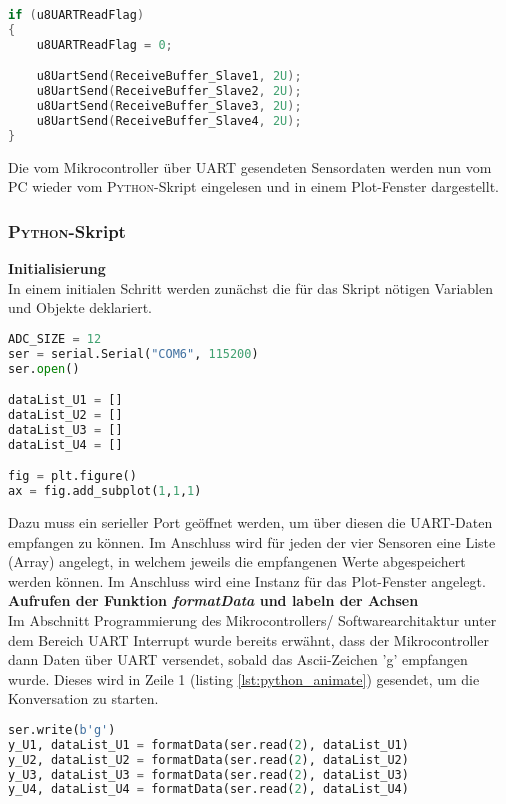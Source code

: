 \documentclass[
	letterpaper, %
	10pt, %
]{CSUniSchoolLabReport}
\begin{document}
\begin{spacing}{1.6}
\begin{lstlisting}[caption={Auszug aus while(1) - Projekt \glqq Kraftsensor\grqq},label={lst:while1_UART},language=C]
if (u8UARTReadFlag)
{
    u8UARTReadFlag = 0;

    u8UartSend(ReceiveBuffer_Slave1, 2U);
    u8UartSend(ReceiveBuffer_Slave2, 2U);
    u8UartSend(ReceiveBuffer_Slave3, 2U);
    u8UartSend(ReceiveBuffer_Slave4, 2U);
}
\end{lstlisting}
Die vom Mikrocontroller über UART gesendeten Sensordaten werden nun vom PC wieder vom \textsc{Python}-Skript eingelesen und in einem Plot-Fenster dargestellt.

\newpage
\subsubsection{\textsc{Python}-Skript}
\textbf{Initialisierung\\}
In einem initialen Schritt werden zunächst die für das Skript nötigen Variablen und Objekte deklariert.
\begin{lstlisting}[caption={Initialisierung aller Variablen und Objekte im \textsc{Python}-Skript aus dem Projekt Kraftsensor},label={lst:python_anfang},language=python]
ADC_SIZE = 12                            
ser = serial.Serial("COM6", 115200)      
ser.open()

dataList_U1 = []
dataList_U2 = []
dataList_U3 = []
dataList_U4 = []

fig = plt.figure()                                     
ax = fig.add_subplot(1,1,1) 
\end{lstlisting}
Dazu muss ein serieller Port geöffnet werden, um über diesen die UART-Daten empfangen zu können. Im Anschluss wird für jeden der vier Sensoren eine Liste (Array) angelegt, in welchem jeweils die empfangenen Werte abgespeichert werden können. Im Anschluss wird eine Instanz für das Plot-Fenster angelegt.\\


\textbf{Aufrufen der Funktion \textit{formatData} und labeln der Achsen\\}
Im Abschnitt \glqq Programmierung des Mikrocontrollers/ Softwarearchitaktur\grqq $ $ unter dem Bereich \glqq UART Interrupt\grqq $ $ wurde bereits erwähnt, dass der Mikrocontroller dann Daten über UART versendet, sobald das Ascii-Zeichen 'g' empfangen wurde. Dieses wird in Zeile 1 (listing \ref{lst:python_animate}) gesendet, um die \glqq Konversation\grqq $ $ zu starten.
\begin{lstlisting}[caption={Aufrufen der Funktion \textit{formatData} und labeln der Achsen im \textsc{Python}-Skript aus dem Projekt Kraftsensor},label={lst:python_animate},language=python]
ser.write(b'g')
y_U1, dataList_U1 = formatData(ser.read(2), dataList_U1)
y_U2, dataList_U2 = formatData(ser.read(2), dataList_U2)
y_U3, dataList_U3 = formatData(ser.read(2), dataList_U3)
y_U4, dataList_U4 = formatData(ser.read(2), dataList_U4)
     

\end{lstlisting}
\end{spacing}
\end{document}
